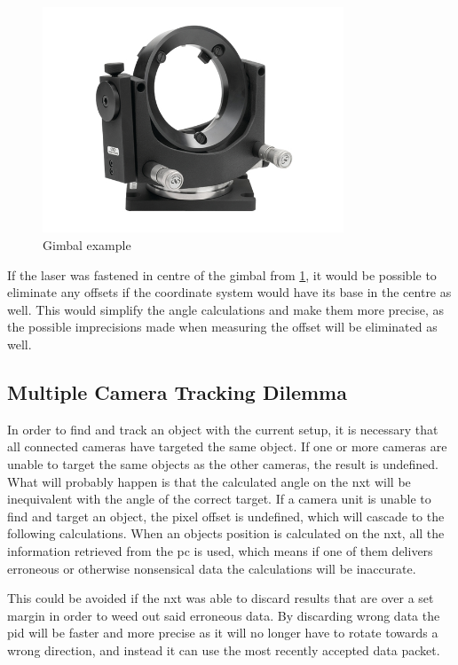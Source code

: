 \begin{figure}[H]
  \centering
  \includegraphics[width=0.80\textwidth]{graphics/discussion/gimbal.jpg}
  \caption{Gimbal example\cite{gimbal}}
  \label{fig:gimbal}
\end{figure}

If the laser was fastened in centre of the gimbal from \cref{fig:gimbal}, it would be possible to eliminate any offsets if the coordinate system would have its base in the centre as well. This would simplify the angle calculations and make them more precise, as the possible imprecisions made when measuring the offset will be eliminated as well.

\subsection{Multiple Camera Tracking Dilemma}\label{subsec:disc_mult_cam}
In order to find and track an object with the current setup, it is necessary that all connected cameras have targeted the same object. If one or more cameras are unable to target the same objects as the other cameras, the result is undefined. What will probably happen is that the calculated angle on the \gls{nxt} will be inequivalent with the angle of the correct target. If a camera unit is unable to find and target an object, the pixel offset is undefined, which will cascade to the following calculations. When an objects position is calculated on the \gls{nxt}, all the information retrieved from the pc is used, which means if one of them delivers erroneous or otherwise nonsensical data the calculations will be inaccurate.

This could be avoided if the \gls{nxt} was able to discard results that are over a set margin in order to weed out said erroneous data. By discarding wrong data the \gls{pid} will be faster and more precise as it will no longer have to rotate towards a wrong direction, and instead it can use the most recently accepted data packet.

